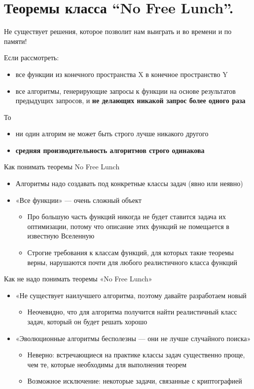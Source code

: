 \section{Теоремы класса “No Free Lunch”.}
Не существует решения, которое позволит нам выиграть и во времени и по памяти!


Если рассмотреть:
\begin{itemize}
    \item все функции из конечного пространства X в конечное пространство Y
    \item все алгоритмы, генерирующие запросы к функции на основе результатов предыдущих запросов, и \textbf{не делающих никакой запрос более одного раза}
\end{itemize}

То
\begin{itemize}
    \item ни один алгорим не может быть строго лучше никакого другого
    \item \textbf{средняя производительность алгоритмов строго одинакова}
\end{itemize}

Как понимать теоремы No Free Lunch
\begin{itemize}
    \item Алгоритмы надо создавать под конкретные классы задач (явно или неявно) 
    \item «Все функции» — очень сложный объект
    \begin{itemize}
        \item Про большую часть функций никогда не будет ставится задача их оптимизации, потому что описание этих функций не помещается в известную Вселенную
        \item Строгие требования к классам функций, для которых такие теоремы верны, нарушаются почти для любого реалистичного класса функций
    \end{itemize}
\end{itemize}


Как не надо понимать теоремы «No Free Lunch»
\begin{itemize}
    \item «Не существует наилучшего алгоритма, поэтому давайте разработаем новый
    \begin{itemize}
        \item Неочевидно, что для алгоритма получится найти реалистичный класс задач, который он будет решать хорошо
    \end{itemize}
    \item «Эволюционные алгоритмы бесполезны — они не лучше случайного поиска»
    \begin{itemize}
        \item Неверно: встречающиеся на практике классы задач существенно проще, чем те, которые необходимы для выполнения теорем
        \item Возможное исключение: некоторые задачи, связанные с криптографией    
    \end{itemize}
\end{itemize}
